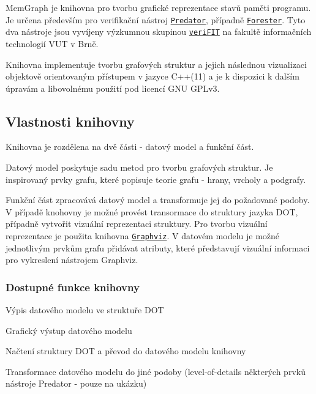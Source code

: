 Mem\+Graph je knihovna pro tvorbu grafické reprezentace stavů paměti programu. Je určena především pro verifikační nástroj \href{http://www.fit.vutbr.cz/research/groups/verifit/tools/predator/}{\tt Predator}, případně \href{http://www.fit.vutbr.cz/research/groups/verifit/tools/forester/}{\tt Forester}. Tyto dva nástroje jsou vyvíjeny výzkumnou skupinou \href{http://www.fit.vutbr.cz/research/groups/verifit/.cs}{\tt veri\+F\+IT} na fakultě informačních technologií V\+UT v Brně.

Knihovna implementuje tvorbu grafových struktur a jejich následnou vizualizaci objektově orientovaným přístupem v jazyce C++(11) a je k dispozici k dalším úpravám a libovolnému použití pod licencí G\+NU G\+P\+Lv3.

\subsection*{Vlastnosti knihovny}

Knihovna je rozdělena na dvě části -\/ datový model a funkční část.

Datový model poskytuje sadu metod pro tvorbu grafových struktur. Je inspirovaný prvky grafu, které popisuje teorie grafu -\/ hrany, vrcholy a podgrafy.

Funkční část zpracovává datový model a transformuje jej do požadované podoby. V případě knohovny je možné provést transormace do struktury jazyka D\+OT, případně vytvořit vizuální reprezentaci struktury. Pro tvorbu vizuální reprezentace je použita knihovna \href{http://www.graphviz.org}{\tt Graphviz}. V datovém modelu je možné jednotlivým prvkům grafu přidávat atributy, které představují vizuální informaci pro vykreslení nástrojem Graphviz.

\subsubsection*{Dostupné funkce knihovny}


\begin{DoxyItemize}
\item Výpis datového modelu ve struktuře D\+OT
\item Grafický výstup datového modelu
\item Načtení struktury D\+OT a převod do datového modelu knihovny
\item Transformace datového modelu do jiné podoby (level-\/of-\/details některých prvků nástroje Predator -\/ pouze na ukázku)
\end{DoxyItemize}

